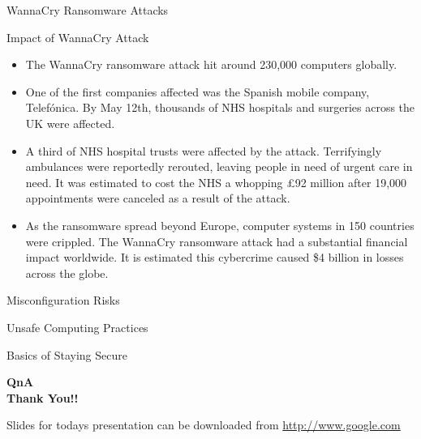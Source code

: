 \documentclass{beamer}
\begin{document}
\begin{frame}{WannaCry Ransomware Attacks}
	\begin{itemize}
\end{itemize}
\end{frame}
\begin{frame}{Impact of WannaCry Attack}
	\begin{itemize}
\item{The WannaCry ransomware attack hit around 230,000 computers globally.}
\item{One of the first companies affected was the Spanish mobile company, Telefónica. By May 12th, thousands of NHS hospitals and surgeries across the UK were affected.}
\item{A third of NHS hospital trusts were affected by the attack. Terrifyingly ambulances were reportedly rerouted, leaving people in need of urgent care in need. It was estimated to cost the NHS a whopping £92 million after 19,000 appointments were canceled as a result of the attack.}
 \item{As the ransomware spread beyond Europe, computer systems in 150 countries were crippled. The WannaCry ransomware attack had a substantial financial impact worldwide. It is estimated this cybercrime caused \$4 billion in losses across the globe.}
	\end{itemize}
\end{frame}

\begin{frame}{Misconfiguration Risks}
	
\end{frame}
\begin{frame}{Unsafe Computing Practices}
\end{frame}
\begin{frame}{Basics of Staying Secure}
\end{frame}
\begin{frame}
	\begin{center}
	\Large \textbf{QnA \\ Thank You!!}
	\end{center}
	\vspace*{3cm}
	\large Slides for todays presentation can be downloaded from \hyperlink{http://www.google.com}{http://www.google.com}
\end{frame}
\end{document}
